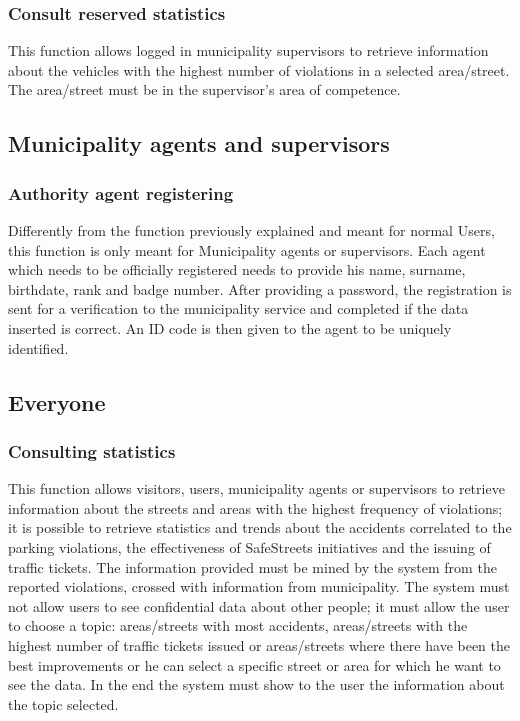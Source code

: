 \documentclass[a4paper]{report}
\begin{document}
\subsubsection{Consult reserved statistics}
This function allows logged in municipality supervisors to retrieve information about the vehicles with the highest number of violations in a selected area/street. The area/street must be in the supervisor's area of competence.

\subsection{Municipality agents and supervisors}
\subsubsection{Authority agent registering}
Differently from the function previously explained and meant for normal Users, this function is only meant for Municipality agents or supervisors. Each agent which needs to be officially registered needs to provide his name, surname, birthdate, rank and badge number. After providing a password, the registration is sent for a verification to the municipality service and completed if the data inserted is correct. An ID code is then given to the agent to be uniquely identified.

\subsection{Everyone} 

\subsubsection{Consulting statistics}
This function allows visitors, users, municipality agents or supervisors to retrieve information about the streets and areas with the highest frequency of violations; it is possible to retrieve statistics and trends about the accidents correlated to the parking violations, the effectiveness of SafeStreets initiatives and the issuing of traffic tickets. The information provided must be mined by the system from the reported violations, crossed with information from municipality. The system must not allow users to see confidential data about other people; it must allow the user to choose a topic: areas/streets with most accidents, areas/streets with the highest number of traffic tickets issued or areas/streets where there have been the best improvements or he can select a specific street or area for which he want to see the data. In the end the system must show to the user the information about the topic selected.
\end{document}

